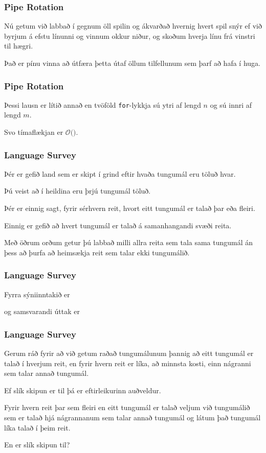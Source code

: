 {
	\frametitle{Pipe Rotation}
	{
		\item<1-> Nú getum við labbað í gegnum öll spilin og ákvarðað hvernig hvert spil snýr ef við byrjum á efstu línunni og vinnum okkur niður,
					og skoðum hverja línu frá vinstri til hægri.
		\item<2-> Það er pínu vinna að útfæra þetta útaf öllum tilfellunum sem þarf að hafa í huga.
	}
}

{
}

{
}

{
	\frametitle{Pipe Rotation}
	{
		\item<1-> Þessi lausn er lítið annað en tvöföld \texttt{for}-lykkja sú ytri af lengd $n$ og sú innri af lengd $m$.
		\item<2-> Svo tímaflækjan er $\mathcal{O}($\onslide<3->{$n \cdot m$}$)$.
	}
}

{
	\frametitle{Language Survey}
	{
		\item<1-> Þér er gefið land sem er skipt í grind eftir hvaða tungumál eru töluð hvar.
		\item<2-> Þú veist að í heildina eru þrjú tungumál töluð.
		\item<3-> Þér er einnig sagt, fyrir sérhvern reit, hvort eitt tungumál er talað þar eða fleiri.
		\item<4-> Einnig er gefið að hvert tungumál er talað á samanhangandi svæði reita.
		\item<5-> Með öðrum orðum getur þú labbað milli allra reita sem tala sama tungumál án þess að þurfa að heimsækja reit sem talar ekki tungumálið.
	}
}

{
	\frametitle{Language Survey}
	{
		\item<1-> Fyrra sýniinntakið er
		\item<2->[] 
		\item<3-> og samsvarandi úttak er
		\item<4->[]
	}
}

{
	\frametitle{Language Survey}
	{
		\item<1-> Gerum ráð fyrir að við getum raðað tungumálunum þannig að eitt tungumál er talað í hverjum reit,
					en fyrir hvern reit er líka, að minnsta kosti, einn nágranni sem talar annað tungumál.
		\item<2-> Ef slík skipun er til þá er eftirleikurinn auðveldur.
		\item<3-> Fyrir hvern reit þar sem fleiri en eitt tungumál er talað veljum við tungumálið sem er talað hjá nágrannanum sem talar annað tungumál
					og látum það tungumál líka talað í þeim reit.
		\item<4-> En er slík skipun til?
	}
}

